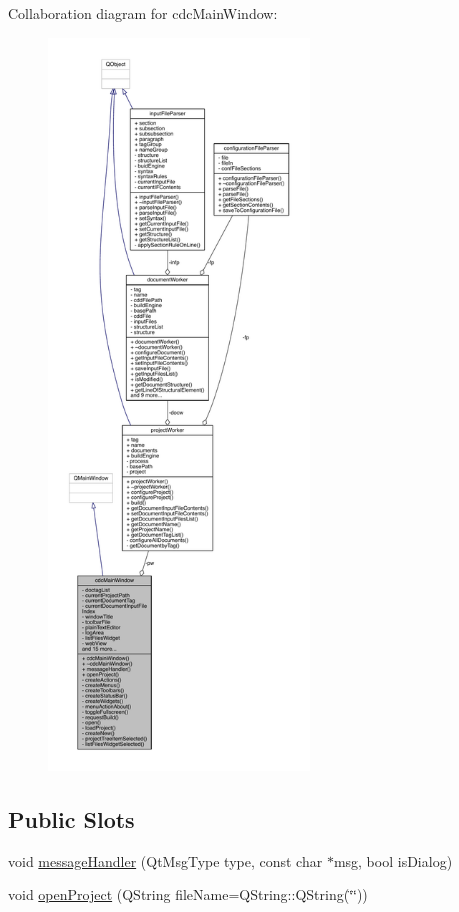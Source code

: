 Collaboration diagram for cdc\+Main\+Window\+:\nopagebreak
\begin{figure}[H]
\begin{center}
\leavevmode
\includegraphics[height=550pt]{classcdc_main_window__coll__graph}
\end{center}
\end{figure}
\subsection*{Public Slots}
\begin{DoxyCompactItemize}
\item 
void \hyperlink{classcdc_main_window_afe66a2955f78dca82931e14113abd139}{message\+Handler} (Qt\+Msg\+Type type, const char $\ast$msg, bool is\+Dialog)
\item 
void \hyperlink{classcdc_main_window_ab0992edf8cb9284fe7068bd24aabce0d}{open\+Project} (Q\+String file\+Name=Q\+String\+::\+Q\+String(\char`\"{}\char`\"{}))
\end{DoxyCompactItemize}
